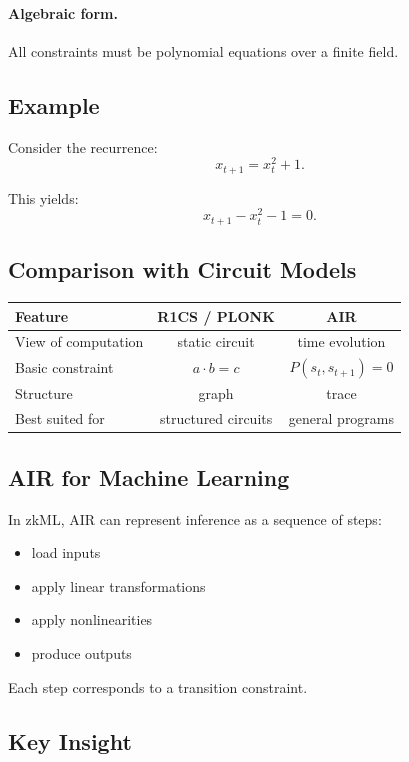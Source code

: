 \paragraph{Algebraic form.}
All constraints must be polynomial equations over a finite field.

\subsection{Example}

Consider the recurrence:
\[
x_{t+1} = x_t^2 + 1.
\]

This yields:
\[
x_{t+1} - x_t^2 - 1 = 0.
\]

\subsection{Comparison with Circuit Models}

\begin{center}
\begin{tabular}{l|c|c}
Feature & R1CS / PLONK & AIR \\
\hline
View of computation & static circuit & time evolution \\
Basic constraint & $a \cdot b = c$ & $P(s_t, s_{t+1}) = 0$ \\
Structure & graph & trace \\
Best suited for & structured circuits & general programs
\end{tabular}
\end{center}

\subsection{AIR for Machine Learning}

In zkML, AIR can represent inference as a sequence of steps:
\begin{itemize}
\item load inputs
\item apply linear transformations
\item apply nonlinearities
\item produce outputs
\end{itemize}

Each step corresponds to a transition constraint.

\subsection{Key Insight}

